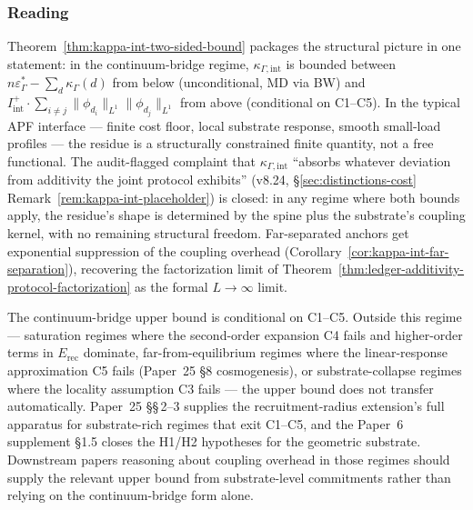 \documentclass[11pt]{article}
\begin{document}
\subsubsection*{Reading}

Theorem~\ref{thm:kappa-int-two-sided-bound} packages the structural picture in one statement: in the continuum-bridge regime, $\kappa_{\Gamma,\mathrm{int}}$ is bounded between $n\varepsilon^*_\Gamma - \sum_d \kappa_\Gamma(d)$ from below (unconditional, MD via BW) and $I_{\mathrm{int}}^+ \cdot \sum_{i\neq j} \|\phi_{d_i}\|_{L^1}\|\phi_{d_j}\|_{L^1}$ from above (conditional on C1--C5).  In the typical APF interface --- finite cost floor, local substrate response, smooth small-load profiles --- the residue is a structurally constrained finite quantity, not a free functional.  The audit-flagged complaint that $\kappa_{\Gamma,\mathrm{int}}$ ``absorbs whatever deviation from additivity the joint protocol exhibits'' (v8.24, \S\ref{sec:distinctions-cost} Remark~\ref{rem:kappa-int-placeholder}) is closed: in any regime where both bounds apply, the residue's shape is determined by the spine plus the substrate's coupling kernel, with no remaining structural freedom.  Far-separated anchors get exponential suppression of the coupling overhead (Corollary~\ref{cor:kappa-int-far-separation}), recovering the factorization limit of Theorem~\ref{thm:ledger-additivity-protocol-factorization} as the formal $L \to \infty$ limit.

The continuum-bridge upper bound is conditional on C1--C5.  Outside this regime --- saturation regimes where the second-order expansion C4 fails and higher-order terms in $E_{\mathrm{rec}}$ dominate, far-from-equilibrium regimes where the linear-response approximation C5 fails (Paper~25 \S8 cosmogenesis), or substrate-collapse regimes where the locality assumption C3 fails --- the upper bound does not transfer automatically.  Paper~25 \S\S\,2--3 supplies the recruitment-radius extension's full apparatus for substrate-rich regimes that exit C1--C5, and the Paper~6 supplement \S1.5 closes the H1/H2 hypotheses for the geometric substrate.  Downstream papers reasoning about coupling overhead in those regimes should supply the relevant upper bound from substrate-level commitments rather than relying on the continuum-bridge form alone.

\bigskip
\end{document}
